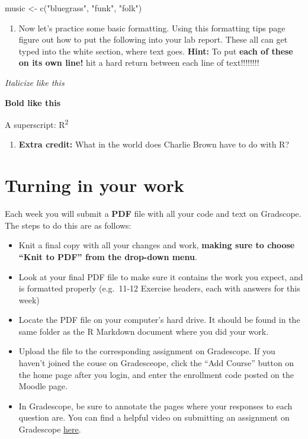 \documentclass[
]{article}
\newenvironment{Shaded}{\begin{snugshade}}{\end{snugshade}}
\newcommand{\FunctionTok}[1]{\textcolor[rgb]{0.00,0.00,0.00}{#1}}
\newcommand{\NormalTok}[1]{#1}
\newcommand{\OtherTok}[1]{\textcolor[rgb]{0.56,0.35,0.01}{#1}}
\newcommand{\StringTok}[1]{\textcolor[rgb]{0.31,0.60,0.02}{#1}}
\providecommand{\tightlist}{%
  \setlength{\itemsep}{0pt}\setlength{\parskip}{0pt}}
\begin{document}
\begin{Shaded}
\begin{Highlighting}[]
\NormalTok{music }\OtherTok{\textless{}{-}} \FunctionTok{c}\NormalTok{(}\StringTok{"bluegrass"}\NormalTok{, }\StringTok{"funk"}\NormalTok{, }\StringTok{"folk"}\NormalTok{)}
\end{Highlighting}
\end{Shaded}

\begin{enumerate}
\def\labelenumi{\arabic{enumi}.}
\tightlist
\item
  Now let's practice some basic formatting. Using this formatting tips
  page figure out how to put the following into your lab report. These
  all can get typed into the white section, where text goes.
  \textbf{Hint:} To put \textbf{each of these on its own line!} hit a
  hard return between each line of text!!!!!!!!
\end{enumerate}

\emph{Italicize like this}

\textbf{Bold like this}

A superscript: R\textsuperscript{2}

\begin{enumerate}
\def\labelenumi{\arabic{enumi}.}
\tightlist
\item
  \textbf{Extra credit:} What in the world does Charlie Brown have to do
  with R?
\end{enumerate}

\hypertarget{turning-in-your-work}{%
\section{Turning in your work}\label{turning-in-your-work}}

Each week you will submit a \textbf{PDF} file with all your code and
text on Gradscope. The steps to do this are as follows:

\begin{itemize}
\tightlist
\item
  Knit a final copy with all your changes and work, \textbf{making sure
  to choose ``Knit to PDF'' from the drop-down menu}.
\item
  Look at your final PDF file to make sure it contains the work you
  expect, and is formatted properly (e.g.~11-12 Exercise headers, each
  with answers for this week)
\item
  Locate the PDF file on your computer's hard drive. It should be found
  in the same folder as the R Markdown document where you did your work.
\item
  Upload the file to the corresponding assignment on Gradescope. If you
  haven't joined the couse on Gradesceope, click the ``Add Course''
  button on the home page after you login, and enter the enrollment code
  posted on the Moodle page.
\item
  In Gradescope, be sure to annotate the pages where your responses to
  each question are. You can find a helpful video on submitting an
  assignment on Gradescope
  \href{https://www.youtube.com/watch?v=KMPoby5g_nE}{here}.
\end{itemize}
\end{document}
